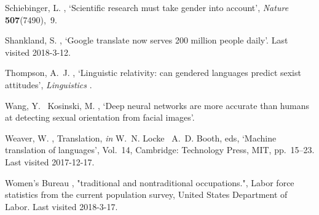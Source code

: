 \documentclass[fleqn,10pt]{article}
\begin{document}
\begin{thebibliography}{xx}
Schiebinger, L.  \harvardyearright , `Scientific research
  must take gender into account', {\em Nature} {\bf 507}(7490),~9.

Shankland, S.  \harvardyearright , `Google translate now
  serves 200 million people daily'.
\newblock Last visited 2018-3-12.
\newline{}

Thompson, A.~J.  \harvardyearright , `Linguistic
  relativity: can gendered languages predict sexist attitudes', {\em
  Linguistics} .

Wang, Y. \harvardand\ Kosinski, M.  \harvardyearright ,
  `Deep neural networks are more accurate than humans at detecting sexual
  orientation from facial images'.

Weaver, W.  \harvardyearright , Translation, {\em in}
  W.~N. Locke \harvardand\ A.~D. Booth, eds, `Machine translation of
  languages', Vol.~14, Cambridge: Technology Press, MIT, pp.~15--23.
\newblock Last visited 2017-12-17.
\newline{}

{Women’s Bureau}  \harvardyearright , "traditional and
  nontraditional occupations.", Labor force statistics from the current
  population survey, United States Department of Labor.
  \newblock Last visited 2018-3-17.
  \newline{}

\end{thebibliography}
\fi
\end{document}
